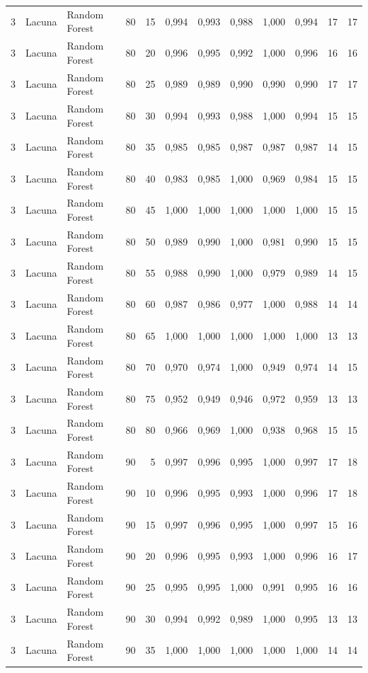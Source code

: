 \begin{longtable}{@{}rllrrrrrrrrr@{}}
3 & Lacuna & Random Forest & 80 & 15 & 0,994 & 0,993 & 0,988 & 1,000 & 0,994 & 17 & 17 \\
3 & Lacuna & Random Forest & 80 & 20 & 0,996 & 0,995 & 0,992 & 1,000 & 0,996 & 16 & 16 \\
3 & Lacuna & Random Forest & 80 & 25 & 0,989 & 0,989 & 0,990 & 0,990 & 0,990 & 17 & 17 \\
3 & Lacuna & Random Forest & 80 & 30 & 0,994 & 0,993 & 0,988 & 1,000 & 0,994 & 15 & 15 \\
3 & Lacuna & Random Forest & 80 & 35 & 0,985 & 0,985 & 0,987 & 0,987 & 0,987 & 14 & 15 \\
3 & Lacuna & Random Forest & 80 & 40 & 0,983 & 0,985 & 1,000 & 0,969 & 0,984 & 15 & 15 \\
3 & Lacuna & Random Forest & 80 & 45 & 1,000 & 1,000 & 1,000 & 1,000 & 1,000 & 15 & 15 \\
3 & Lacuna & Random Forest & 80 & 50 & 0,989 & 0,990 & 1,000 & 0,981 & 0,990 & 15 & 15 \\
3 & Lacuna & Random Forest & 80 & 55 & 0,988 & 0,990 & 1,000 & 0,979 & 0,989 & 14 & 15 \\
3 & Lacuna & Random Forest & 80 & 60 & 0,987 & 0,986 & 0,977 & 1,000 & 0,988 & 14 & 14 \\
3 & Lacuna & Random Forest & 80 & 65 & 1,000 & 1,000 & 1,000 & 1,000 & 1,000 & 13 & 13 \\
3 & Lacuna & Random Forest & 80 & 70 & 0,970 & 0,974 & 1,000 & 0,949 & 0,974 & 14 & 15 \\
3 & Lacuna & Random Forest & 80 & 75 & 0,952 & 0,949 & 0,946 & 0,972 & 0,959 & 13 & 13 \\
3 & Lacuna & Random Forest & 80 & 80 & 0,966 & 0,969 & 1,000 & 0,938 & 0,968 & 15 & 15 \\
3 & Lacuna & Random Forest & 90 & 5 & 0,997 & 0,996 & 0,995 & 1,000 & 0,997 & 17 & 18 \\
3 & Lacuna & Random Forest & 90 & 10 & 0,996 & 0,995 & 0,993 & 1,000 & 0,996 & 17 & 18 \\
3 & Lacuna & Random Forest & 90 & 15 & 0,997 & 0,996 & 0,995 & 1,000 & 0,997 & 15 & 16 \\
3 & Lacuna & Random Forest & 90 & 20 & 0,996 & 0,995 & 0,993 & 1,000 & 0,996 & 16 & 17 \\
3 & Lacuna & Random Forest & 90 & 25 & 0,995 & 0,995 & 1,000 & 0,991 & 0,995 & 16 & 16 \\
3 & Lacuna & Random Forest & 90 & 30 & 0,994 & 0,992 & 0,989 & 1,000 & 0,995 & 13 & 13 \\
3 & Lacuna & Random Forest & 90 & 35 & 1,000 & 1,000 & 1,000 & 1,000 & 1,000 & 14 & 14 \\

\end{longtable}

